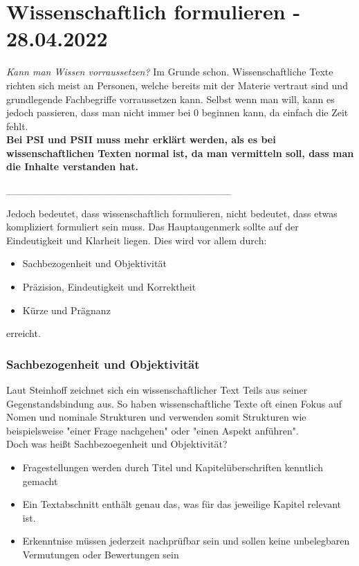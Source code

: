 \documentclass{article}
\begin{document}
	\section{Wissenschaftlich formulieren - 28.04.2022}
	\textit{Kann man Wissen vorraussetzen?}
	Im Grunde schon. Wissenschaftliche Texte richten sich meist an Personen, welche bereits mit der Materie vertraut sind und grundlegende Fachbegriffe vorraussetzen kann. Selbst wenn man will, kann es jedoch passieren, dass man nicht immer bei 0 beginnen kann, da einfach die Zeit fehlt. \\
	\textbf{Bei PSI und PSII muss mehr erklärt werden, als es bei wissenschaftlichen Texten normal ist, da man vermitteln soll, dass man die Inhalte verstanden hat.}
	\begin{center}
	\_\_\_\_\_\_\_\_\_\_\_\_\_\_\_\_\_\_\_\_\_\_\_\_\_\_\_\_\_\_\_
	\end{center}
	Jedoch bedeutet, dass wissenschaftlich formulieren, nicht bedeutet, dass etwas kompliziert formuliert sein muss. Das Hauptaugenmerk sollte auf der Eindeutigkeit und Klarheit liegen. Dies wird vor allem durch:
	\begin{itemize}
		\item{Sachbezogenheit und Objektivität}
		\item{Präzision, Eindeutigkeit und Korrektheit}
		\item{Kürze und Prägnanz}
	\end{itemize}
	erreicht. \\
	\subsubsection{Sachbezogenheit und Objektivität}
	Laut Steinhoff zeichnet sich ein wissenschaftlicher Text Teils aus seiner Gegenstandsbindung aus. So haben wissenschaftliche Texte oft einen Fokus auf Nomen und nominale Strukturen und verwenden somit Strukturen wie beispielsweise "einer Frage nachgehen" oder "einen Aspekt anführen". \\
	Doch was heißt Sachbezoegenheit und Objektivität? \\
	\begin{itemize}
		\item{Fragestellungen werden durch Titel und Kapitelüberschriften kenntlich gemacht}
		\item{Ein Textabschnitt enthält genau das, was für das jeweilige Kapitel relevant ist.}
		\item{Erkenntnise müssen jederzeit nachprüfbar sein und sollen keine unbelegbaren Vermutungen oder Bewertungen sein}
	\end{itemize}
\end{document}
